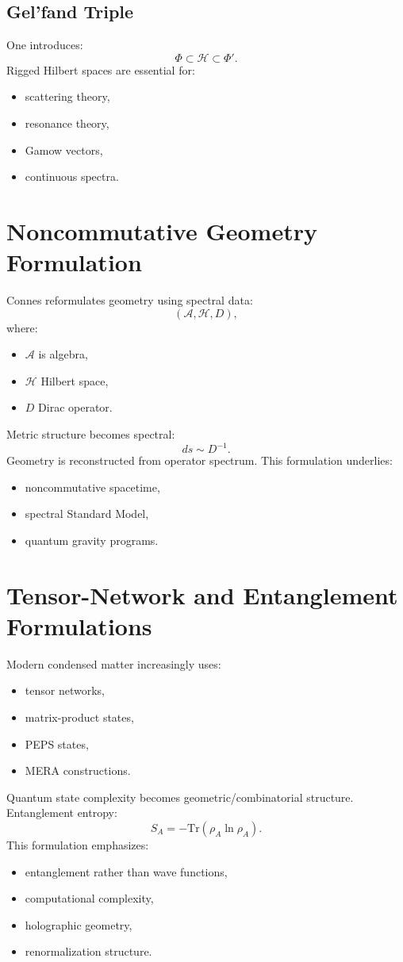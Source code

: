 \subsection{Gel'fand Triple}
One introduces:
\[\Phi\subset\mathcal H\subset\Phi'.\]
Rigged Hilbert spaces are essential for:
\begin{itemize}
\item scattering theory,
\item resonance theory,
\item Gamow vectors,
\item continuous spectra.
\end{itemize}

\section{Noncommutative Geometry Formulation}
\label{qmf:ng}
Connes reformulates geometry using spectral data:
\[(\mathcal A,\mathcal H,D),\]
where:
\begin{itemize}
\item $\mathcal A$ is algebra,
\item $\mathcal H$ Hilbert space,
\item $D$ Dirac operator.
\end{itemize}
Metric structure becomes spectral:
\[ds\sim D^{-1}.\]
Geometry is reconstructed from operator spectrum.
This formulation underlies:
\begin{itemize}
\item noncommutative spacetime,
\item spectral Standard Model,
\item quantum gravity programs.
\end{itemize}

\section{Tensor-Network and Entanglement Formulations}
\label{qmf:tn}
Modern condensed matter increasingly uses:
\begin{itemize}
\item tensor networks,
\item matrix-product states,
\item PEPS states,
\item MERA constructions.
\end{itemize}
Quantum state complexity becomes geometric/combinatorial structure.
Entanglement entropy:
\[S_A=-\mathrm{Tr}(\rho_A \ln \rho_A).\]
This formulation emphasizes:
\begin{itemize}
\item entanglement rather than wave functions,
\item computational complexity,
\item holographic geometry,
\item renormalization structure.
\end{itemize}

